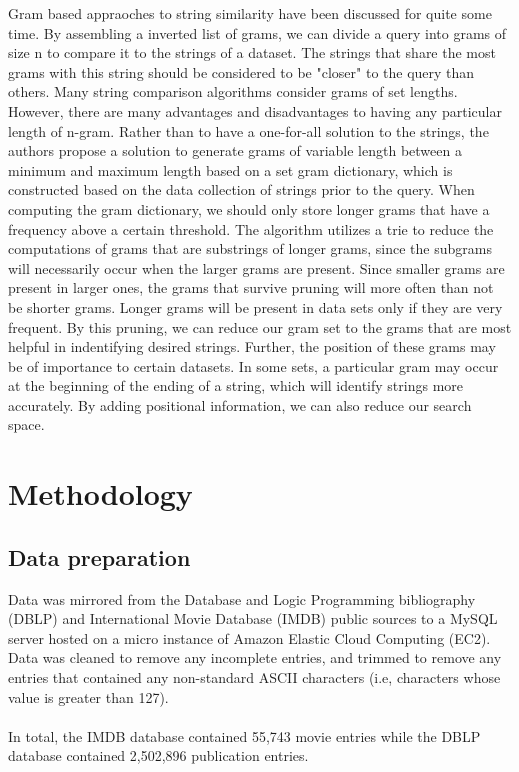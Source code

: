 \documentclass[pdftex,12pt,letter]{article}
\begin{document}
Gram based appraoches to string similarity have been discussed for quite some time. By assembling a inverted list of grams, we can divide a query into grams of size n to compare it to the strings of a dataset. The strings that share the most grams with this string should be considered to be "closer" to the query than others. Many string comparison algorithms consider grams of set lengths. However, there are many advantages and disadvantages to having any particular length of n-gram. Rather than to have a one-for-all solution to the strings, the authors propose a solution to generate grams of variable length between a minimum and maximum length based on a set gram dictionary, which is constructed based on the data collection of strings prior to the query. When computing the gram dictionary, we should only store longer grams that have a frequency above a certain threshold. The algorithm utilizes a trie to reduce the computations of grams that are substrings of longer grams, since the subgrams will necessarily occur when the larger grams are present. Since smaller grams are present in larger ones, the grams that survive pruning will more often than not be shorter grams. Longer grams will be present in data sets only if they are very frequent. By this pruning, we can reduce our gram set to the grams that are most helpful in indentifying desired strings. Further, the position of these grams may be of importance to certain datasets. In some sets, a particular gram may occur at the beginning of the ending of a string, which will identify strings more accurately. By adding positional information, we can also reduce our search space. 

\section{Methodology}
\subsection{Data preparation}
Data was mirrored from the Database and Logic Programming bibliography (DBLP) and International Movie Database (IMDB) public sources to a MySQL server hosted on a micro instance of Amazon Elastic Cloud Computing (EC2). Data was cleaned to remove any incomplete entries, and trimmed to remove any entries that contained any non-standard ASCII characters (i.e, characters whose value is greater than 127).\\
\\
In total, the IMDB database contained 55,743 movie entries while the DBLP database contained 2,502,896 publication entries.
\end{document}
